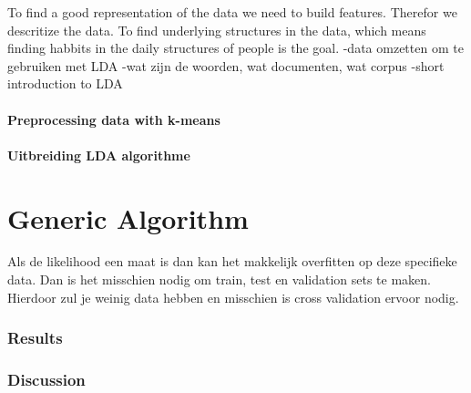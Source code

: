 \documentclass[11pt,a4paper]{report}
\begin{document}
To find a good representation of the data we need to build features. Therefor we descritize the data. 
To find underlying structures in the data, which means finding habbits in the daily structures of people is the goal.
-data omzetten om te gebruiken met LDA
-wat zijn de woorden, wat documenten, wat corpus
-short introduction to LDA

\subsection{Preprocessing data with k-means}


\subsection{Uitbreiding LDA algorithme}

\part{Generic Algorithm}
Als de likelihood een maat is dan kan het makkelijk overfitten op deze specifieke data. Dan is het misschien nodig om train, test en validation sets te maken. Hierdoor zul je weinig data hebben en misschien is cross validation ervoor nodig.

\section{Results}


\section{Discussion}
\end{document}
